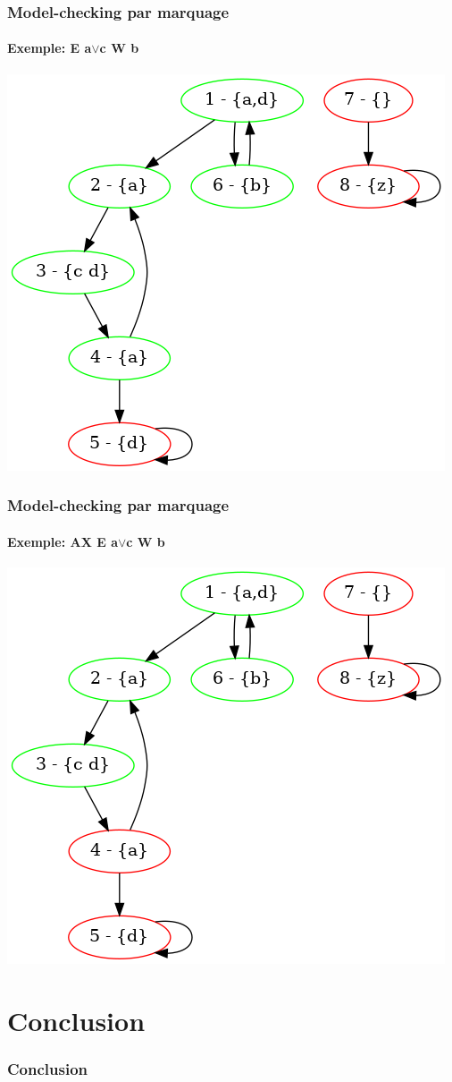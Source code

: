 \documentclass[11pt]{beamer}
\begin{document}
\begin{frame}
    \frametitle{Model-checking par marquage}
    \framesubtitle{Exemple: E a$\lor$c W b}

    \includegraphics[scale=0.4]{imgs/marquage3.png}
\end{frame}

\begin{frame}
    \frametitle{Model-checking par marquage}
    \framesubtitle{Exemple: AX E a$\lor$c W b}

    \includegraphics[scale=0.4]{imgs/marquage4.png}
\end{frame}

\section*{Conclusion}
\begin{frame}
    \frametitle{Conclusion}
\end{frame}
\end{document}

